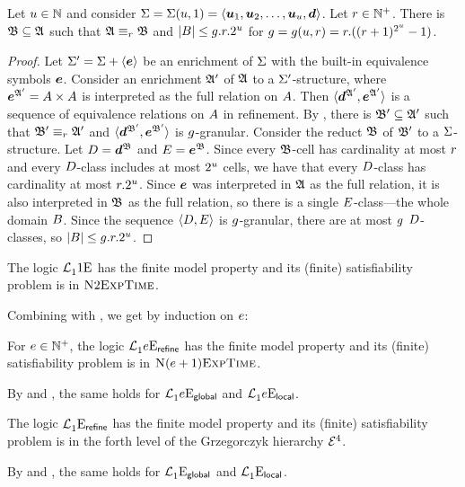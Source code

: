 \begin{remark}\label{rem:monadic-1}
Let $u \in \mathbb{N}$ and consider $\mathrm{\Sigma} = \mathrm{\Sigma}(u,1) =
\left\langle \bm{u}_{1},\bm{u}_{2},\dots,\bm{u}_{u},\bm{d} \right\rangle$. Let $r \in \mathbb{N}^{+}$.
There is $\mathfrak{B} \subseteq \mathfrak{A}$ such that $\mathfrak{A} \equiv_{r} \mathfrak{B}$ and
$\left|B\right| \leq g.r.2^u$ for $g = g(u, r) =
r.((r+1)^{2^u}-1)$.
\end{remark}
\begin{proof}
Let $\mathrm{\Sigma'} = \mathrm{\Sigma} + \left\langle \bm{e} \right\rangle$ be an enrichment of $\mathrm{\Sigma}$ with the built-in
equivalence symbols $\bm{e}$. Consider an enrichment $\mathfrak{A'}$ of $\mathfrak{A}$ to a
$\mathrm{\Sigma'}$-structure, where $\bm{e}^{\mathfrak{A'}} = {A\times A}$ is interpreted as the
full relation on $A$. Then $\langle \bm{d}^{\mathfrak{A'}}, \bm{e}^{\mathfrak{A'}} \rangle$ is a
sequence of equivalence relations on $A$ in refinement.
By , there is $\mathfrak{B'} \subseteq \mathfrak{A'}$ such that
$\mathfrak{B'} \equiv_{r} \mathfrak{A'}$ and $\langle \bm{d}^{\mathfrak{B'}},\bm{e}^{\mathfrak{B'}} \rangle$ is
$g$-granular.
Consider the reduct $\mathfrak{B}$ of $\mathfrak{B'}$ to a
$\mathrm{\Sigma}$-structure. Let $D = \bm{d}^{\mathfrak{B}}$ and $E = \bm{e}^{\mathfrak{B}}$.
Since every $\mathfrak{B}$-cell has
cardinality at most $r$ and every $D$-class includes at most $2^u$
cells, we have that every $D$-class has cardinality at most $r.2^u$.
Since $\bm{e}$ was interpreted in $\mathfrak{A}$ as the full relation, it is also
interpreted in $\mathfrak{B}$ as the full relation, so there is a single
$E$-class---the whole domain $B$.
Since the sequence $\left\langle D, E \right\rangle$ is $g$-granular, there are at most
$g$ $D$-classes, so $\left|B\right| \leq g.r.2^u$.
\end{proof}

\begin{corollary}\label{cor:monadic-base}
The logic $\mathcal{L}^{{}}_{1}{1}\mathrm{E}_{{}}$ has the finite model property and its
(finite) satisfiability problem is in $\text{\normalfont{\scshape N}}2\text{\normalfont{\scshape ExpTime}}$.
\end{corollary}

Combining  with , we get by
induction on $e$:
\begin{proposition}\label{prop:mon-in}
For $e \in \mathbb{N}^{+}$, the logic $\mathcal{L}^{{}}_{1}{e}\mathrm{E}_{\mathsf{refine}}$ has the finite
model property and its (finite) satisfiability problem is in
$\text{\normalfont{\scshape N}}(e+1)\text{\normalfont{\scshape ExpTime}}$.

By  and , the same
holds for $\mathcal{L}^{{}}_{1}{e}\mathrm{E}_{\mathsf{global}}$ and $\mathcal{L}^{{}}_{1}{e}\mathrm{E}_{\mathsf{local}}$.
\end{proposition}
\begin{proposition}
The logic $\mathcal{L}^{{}}_{1}{{}}\mathrm{E}_{\mathsf{refine}}$ has the finite
model property and its (finite) satisfiability problem is in the forth level of
the Grzegorczyk hierarchy $\mathcal{E}^{4}$.

By  and , the same holds
for $\mathcal{L}^{{}}_{1}{{}}\mathrm{E}_{\mathsf{global}}$ and $\mathcal{L}^{{}}_{1}{{}}\mathrm{E}_{\mathsf{local}}$.
\end{proposition}

